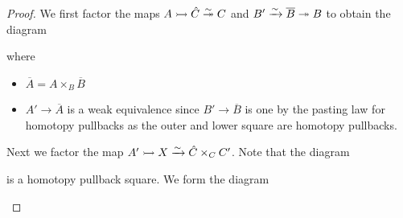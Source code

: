 \begin{prop}
\begin{proof}
        We first factor the maps $A\xtailrightarrow{}\hat{C}\xtwoheadrightarrow[]{\sim} C$ and $B'\xrightarrow{\sim}\overline{B}\xtwoheadrightarrow{} B$ to obtain the diagram
        \begin{center}
        \end{center}
        where 
        \begin{itemize}
            \item $\overline{A}=A\times_{B}\overline{B}$
            \item $A'\to \overline{A}$ is a weak equivalence since $B'\to\overline{B}$ is one by the pasting law for homotopy pullbacks as the outer and lower square are homotopy pullbacks.
        \end{itemize}
        Next we factor the map $A'\xtailrightarrow{}X\xrightarrow{\sim}\hat{C}\times_CC'$. 
        Note that the diagram 
        \begin{center}
        \end{center}
        is a homotopy pullback square.
        We form the diagram
        \begin{center}
\end{center}
\end{proof}
\end{prop}
